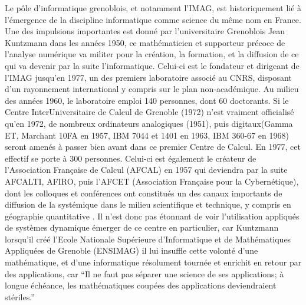Le pôle d'informatique grenoblois, et notamment l'IMAG, est historiquement lié à l'émergence de la discipline informatique comme science du même nom en France. Une des impulsions importantes est donné par l'universitaire Grenoblois Jean Kuntzmann dans les années 1950, ce mathématicien et supporteur précoce de l'analyse numérique va militer pour la création, la formation, et la diffusion de ce qui va devenir par la suite l'informatique. Celui-ci est le fondateur et dirigeant de l'IMAG jusqu'en 1977, un des premiers laboratoire associé au CNRS, disposant d'un rayonnement international y compris sur le plan non-académique. Au milieu des années 1960, le laboratoire emploi 140 personnes, dont 60 doctorants. Si le Centre InterUniversitaire de Calcul de Grenoble (1972) n'est vraiment officialisé qu'en 1972, de nombreux ordinateurs analogiques (1951), puis digitaux(Gamma ET, Marchant 10FA en 1957, IBM 7044 et 1401 en 1963, IBM 360-67 en 1968) seront amenés à passer bien avant dans ce premier Centre de Calcul. En 1977, cet effectif se porte à 300 personnes. Celui-ci est également le créateur de l'Association Française de Calcul (AFCAL) en 1957 qui deviendra par la suite AFCALTI, AFIRO, puis l'AFCET (Association Française pour la Cybernétique), dont les colloques et conférences ont constitués un des canaux importants de diffusion de la systémique dans le milieu scientifique et technique, y compris en géographie quantitative \autocite{Pumain2003}. Il n'est donc pas étonnant de voir l'utilisation appliqués de systèmes dynamique émerger de ce centre en particulier, car Kuntzmann lorsqu'il créé l'Ecole Nationale Supérieure d'Informatique et de Mathématiques Appliquées de Grenoble (ENSIMAG) il lui insuffle cette volonté d'une mathématique, et d'une informatique résolument tournée et enrichit en retour par des applications, car \enquote{Il ne faut pas séparer une science de ses applications; à longue échéance, les mathématiques coupées des applications deviendraient stériles.} \autocites[422]{Mounier2012}{Chiffres1977}

